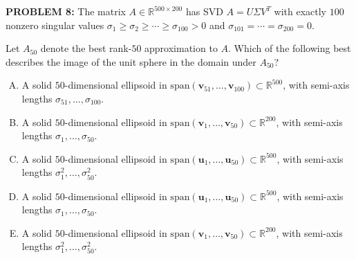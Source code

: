 \documentclass[12pt]{amsart}
\begin{document}
{\bf PROBLEM 8:}
The matrix $A \in \mathbb{R}^{500 \times 200}$ has SVD $A = U\Sigma V^T$ with exactly $100$ nonzero singular values $\sigma_1 \geq \sigma_2 \geq \cdots \geq \sigma_{100} > 0$ and $\sigma_{101} = \cdots = \sigma_{200} = 0$.

Let $A_{50}$ denote the best rank-$50$ approximation to $A$. Which of the following best describes the image of the unit sphere in the domain under $A_{50}$?

\begin{enumerate}[(A)]
\item A solid $50$-dimensional ellipsoid in $\mathrm{span}(\mathbf{v}_{51}, \ldots, \mathbf{v}_{100}) \subset \mathbb{R}^{500}$, with semi-axis lengths $\sigma_{51}, \ldots, \sigma_{100}$.
\item A solid $50$-dimensional ellipsoid in $\mathrm{span}(\mathbf{v}_1, \ldots, \mathbf{v}_{50}) \subset \mathbb{R}^{200}$, with semi-axis lengths $\sigma_1, \ldots, \sigma_{50}$.
\item A solid $50$-dimensional ellipsoid in $\mathrm{span}(\mathbf{u}_1, \ldots, \mathbf{u}_{50}) \subset \mathbb{R}^{500}$, with semi-axis lengths $\sigma_1^2, \ldots, \sigma_{50}^2$.
\item A solid $50$-dimensional ellipsoid in $\mathrm{span}(\mathbf{u}_1, \ldots, \mathbf{u}_{50}) \subset \mathbb{R}^{500}$, with semi-axis lengths $\sigma_1, \ldots, \sigma_{50}$.
\item A solid $50$-dimensional ellipsoid in $\mathrm{span}(\mathbf{v}_1, \ldots, \mathbf{v}_{50}) \subset \mathbb{R}^{200}$, with semi-axis lengths $\sigma_1^2, \ldots, \sigma_{50}^2$.
\end{enumerate}
\end{document}
